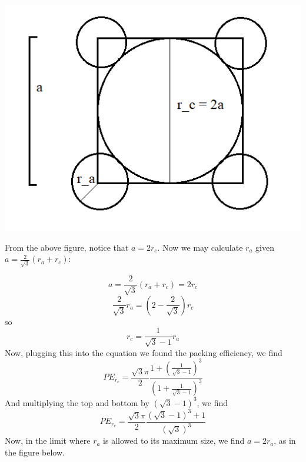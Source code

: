 \documentclass{article}
\begin{document}
\begin{center}
    \includegraphics[scale = 0.4]{CsClrcLim.PNG}
\end{center}

From the above figure, notice that $a = 2r_c$. Now we may calculate $r_a$ given $a = \frac{2}{\sqrt{3}}(r_a + r_c)$:

\[a = \frac{2}{\sqrt{3}}(r_a + r_c) = 2r_c\]
\[\frac{2}{\sqrt{3}}r_a = (2 - \frac{2}{\sqrt{3}})r_c\]
so
\[r_c = \frac{1}{\sqrt{3}-1}r_a\]
Now, plugging this into the equation we found the packing efficiency, we find
\[PE_{r_c} = \frac{\sqrt{3}\pi}{2} \frac{1 + \left(\frac{1}{\sqrt{3}-1}\right)^3}{\left(1 + \frac{1}{\sqrt{3}-1}\right)^3}\]
And multiplying the top and bottom by $(\sqrt{3} - 1)^3$, we find
\[PE_{r_c} = \frac{\sqrt{3}\pi}{2} \frac{(\sqrt{3} - 1)^3 + 1}{(\sqrt{3})^3}\]
Now, in the limit where $r_a$ is allowed to its maximum size, we find $a = 2r_a$, as in the figure below.
\end{document}
